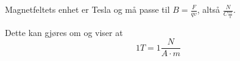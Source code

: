 Magnetfeltets enhet er Tesla og må passe til $B=\frac{F}{qv}$,
altså $\frac{N}{C\frac{m}{s}}$.

Dette kan gjøres om og viser at
$$1T = 1\frac{N}{A\cdot m}$$
